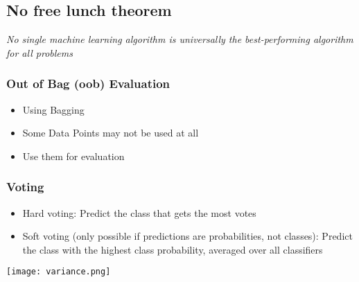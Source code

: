 \subsection{No free lunch theorem}
\textit{No single machine learning algorithm is universally the best-performing algorithm for all problems}

\subsubsection{Out of Bag (oob) Evaluation}
\begin{itemize}
    \item Using Bagging
    \item Some Data Points may not be used at all
    \item Use them for evaluation 
\end{itemize}

\subsubsection{Voting}
\begin{itemize}
    \item Hard voting: Predict the class that gets the most votes
    \item Soft voting (only possible if predictions are probabilities, not classes): Predict the class with the highest class probability, averaged over all classifiers
\end{itemize}
\texttt{[image: variance.png]}